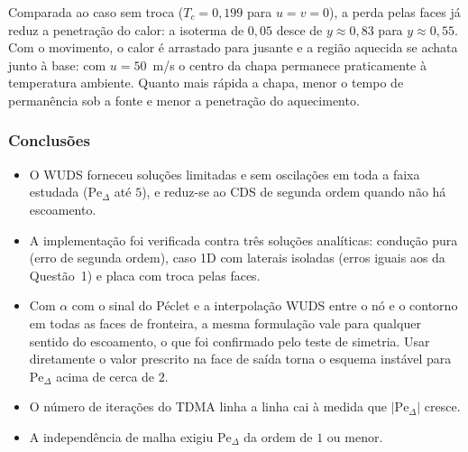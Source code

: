 Comparada ao caso sem troca ($T_c=0{,}199$ para $u=v=0$), a perda pelas faces
já reduz a penetração do calor: a isoterma de $0{,}05$ desce de
$y\approx0{,}83$ para $y\approx0{,}55$. Com o movimento,
o calor é arrastado para jusante e a região aquecida se achata junto à base:
com $u=50$~m/s o centro da chapa permanece praticamente à temperatura
ambiente. Quanto mais rápida a chapa, menor o tempo de permanência sob a
fonte e menor a penetração do aquecimento.

\vspace{0.5cm}

\subsubsection*{Conclusões}

\begin{itemize}
  \item O WUDS forneceu soluções limitadas e sem oscilações em toda a faixa
        estudada ($\mathrm{Pe}_\Delta$ até $5$), e reduz-se ao CDS de segunda
        ordem quando não há escoamento.
  \item A implementação foi verificada contra três soluções analíticas:
        condução pura (erro de segunda ordem), caso 1D com laterais isoladas
        (erros iguais aos da Questão~1) e placa com troca pelas faces.
  \item Com $\alpha$ com o sinal do Péclet e a interpolação WUDS entre o nó
        e o contorno em todas as faces de fronteira, a mesma formulação vale
        para qualquer sentido do escoamento, o que foi confirmado pelo teste
        de simetria. Usar diretamente o valor prescrito na face de saída
        torna o esquema instável para $\mathrm{Pe}_{\Delta}$ acima de cerca
        de $2$.
  \item O número de iterações do TDMA linha a linha cai à medida que
        $|\mathrm{Pe}_\Delta|$ cresce.
  \item A independência de malha exigiu $\mathrm{Pe}_\Delta$ da ordem de $1$ ou menor.
\end{itemize}